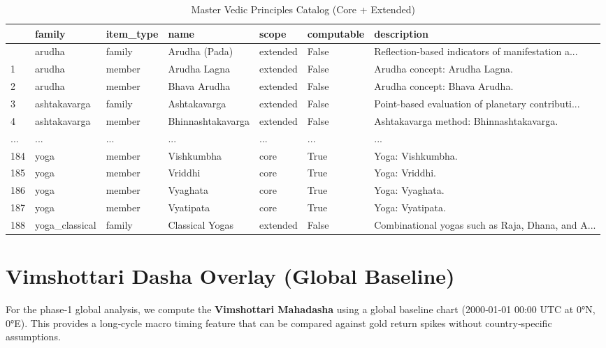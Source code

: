 \documentclass[
  11pt,
  a4paper,
  oneside,
  openany]{report}
\begin{document}
\begin{longtable}[]{@{}lllllll@{}}

\caption{\label{tbl-gold-vedic-master}Master Vedic Principles Catalog
(Core + Extended)}

\tabularnewline

\toprule\noalign{}
& family & item\_type & name & scope & computable & description \\
\midrule\noalign{}
\endhead
\bottomrule\noalign{}
\endlastfoot
0 & arudha & family & Arudha (Pada) & extended & False &
Reflection-based indicators of manifestation a... \\
1 & arudha & member & Arudha Lagna & extended & False & Arudha concept:
Arudha Lagna. \\
2 & arudha & member & Bhava Arudha & extended & False & Arudha concept:
Bhava Arudha. \\
3 & ashtakavarga & family & Ashtakavarga & extended & False &
Point-based evaluation of planetary contributi... \\
4 & ashtakavarga & member & Bhinnashtakavarga & extended & False &
Ashtakavarga method: Bhinnashtakavarga. \\
... & ... & ... & ... & ... & ... & ... \\
184 & yoga & member & Vishkumbha & core & True & Yoga: Vishkumbha. \\
185 & yoga & member & Vriddhi & core & True & Yoga: Vriddhi. \\
186 & yoga & member & Vyaghata & core & True & Yoga: Vyaghata. \\
187 & yoga & member & Vyatipata & core & True & Yoga: Vyatipata. \\
188 & yoga\_classical & family & Classical Yogas & extended & False &
Combinational yogas such as Raja, Dhana, and A... \\

\end{longtable}

\chapter{Vimshottari Dasha Overlay (Global
Baseline)}\label{vimshottari-dasha-overlay-global-baseline}

For the phase‑1 global analysis, we compute the \textbf{Vimshottari
Mahadasha} using a global baseline chart (2000‑01‑01 00:00 UTC at 0°N,
0°E). This provides a long‑cycle macro timing feature that can be
compared against gold return spikes without country‑specific
assumptions.
\end{document}
